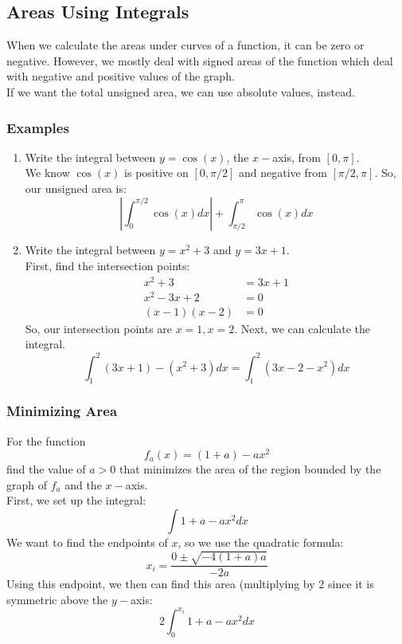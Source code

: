 \documentclass{article}
\begin{document}
\subsection{Areas Using Integrals}
When we calculate the areas under curves of a function, it can be zero or negative. However, we mostly deal with signed areas of the function which deal with negative and positive values of the graph.\\
If we want the total unsigned area, we can use absolute values, instead.

\subsubsection{Examples}
\begin{enumerate}
    \item Write the integral between $y = \cos(x)$, the $x-$axis, from $[0,\pi]$.\\
    We know $\cos(x)$ is positive on $[0,\pi/2]$ and negative from $[\pi/2,\pi]$. So, our unsigned area is:
    $$|\int_0^{\pi/2} \cos(x) dx| + \int_{\pi/2}^{\pi}\cos(x) dx$$
    
    \item Write the integral between $y=x^2+3$ and $y=3x+1$.\\
    First, find the intersection points:
    \begin{align*}
        x^2 + 3 & = 3x + 1\\
        x^2 - 3x + 2 & = 0\\
        (x-1)(x-2) & = 0
    \end{align*}
    So, our intersection points are $x = 1, x=2$. Next, we can calculate the integral.
    $$\int_1^2 (3x+1) - (x^2+3) dx = \int_1^2 (3x-2-x^2)dx$$
\end{enumerate}

\subsubsection{Minimizing Area}
For the function
$$f_a(x) = (1+a) - ax^2$$
find the value of $a >0$ that minimizes the area of the region bounded by the graph of $f_a$ and the $x-$axis.\\
First, we set up the integral:
$$\int 1 + a - ax^2 dx$$
We want to find the endpoints of $x$, so we use the quadratic formula:
$$x_i = \frac{0\pm \sqrt{-4(1+a)a}}{-2a}$$
Using this endpoint, we then can find this area (multiplying by 2 since it is symmetric above the $y-$axis:
$$2 \int_0^{x_i} 1 + a - ax^2 dx$$
\end{document}
